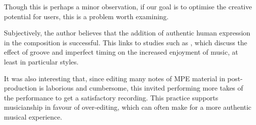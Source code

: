 Though this is perhaps a minor observation, if our goal is to optimise the creative potential for users, this is a problem worth examining. 


Subjectively, the author believes that the addition of authentic human expression in the composition is successful. This links to studies such as \cite{witek_syncopation_2014}, which discuss the effect of groove and imperfect timing on the increased enjoyment of music, at least in particular styles. 

It was also interesting that, since editing many notes of MPE material in post-production is laborious and cumbersome, this invited performing more takes of the performance to get a satisfactory recording. This practice supports musicianship in favour of over-editing, which can often make for a more authentic musical experience. 









